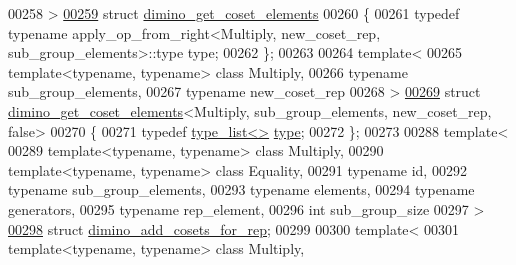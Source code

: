 \begin{DoxyCode}
00258 >
\hyperlink{struct_eigen_1_1internal_1_1group__theory_1_1dimino__get__coset__elements}{00259} \textcolor{keyword}{struct }\hyperlink{struct_eigen_1_1internal_1_1group__theory_1_1dimino__get__coset__elements}{dimino\_get\_coset\_elements}
00260 \{
00261   \textcolor{keyword}{typedef} \textcolor{keyword}{typename} apply\_op\_from\_right<Multiply, new\_coset\_rep, sub\_group\_elements>::type type;
00262 \};
00263 
00264 \textcolor{keyword}{template}<
00265   \textcolor{keyword}{template}<\textcolor{keyword}{typename}, \textcolor{keyword}{typename}> \textcolor{keyword}{class }Multiply,
00266   \textcolor{keyword}{typename} sub\_group\_elements,
00267   \textcolor{keyword}{typename} new\_coset\_rep
00268 >
\hyperlink{struct_eigen_1_1internal_1_1group__theory_1_1dimino__get__coset__elements_3_01_multiply_00_01sub6a817ae4e5806a51bb78ea524863d341}{00269} \textcolor{keyword}{struct }\hyperlink{struct_eigen_1_1internal_1_1group__theory_1_1dimino__get__coset__elements}{dimino\_get\_coset\_elements}<Multiply, sub\_group\_elements, new\_coset\_rep, 
      false>
00270 \{
00271   \textcolor{keyword}{typedef} \hyperlink{struct_eigen_1_1internal_1_1type__list}{type\_list<>} \hyperlink{struct_eigen_1_1internal_1_1type__list}{type};
00272 \};
00273 
00288 \textcolor{keyword}{template}<
00289   \textcolor{keyword}{template}<\textcolor{keyword}{typename}, \textcolor{keyword}{typename}> \textcolor{keyword}{class }Multiply,
00290   \textcolor{keyword}{template}<\textcolor{keyword}{typename}, \textcolor{keyword}{typename}> \textcolor{keyword}{class }Equality,
00291   \textcolor{keyword}{typename} id,
00292   \textcolor{keyword}{typename} sub\_group\_elements,
00293   \textcolor{keyword}{typename} elements,
00294   \textcolor{keyword}{typename} generators,
00295   \textcolor{keyword}{typename} rep\_element,
00296   \textcolor{keywordtype}{int} sub\_group\_size
00297 >
\hyperlink{struct_eigen_1_1internal_1_1group__theory_1_1dimino__add__cosets__for__rep}{00298} \textcolor{keyword}{struct }\hyperlink{struct_eigen_1_1internal_1_1group__theory_1_1dimino__add__cosets__for__rep}{dimino\_add\_cosets\_for\_rep};
00299 
00300 \textcolor{keyword}{template}<
00301   \textcolor{keyword}{template}<\textcolor{keyword}{typename}, \textcolor{keyword}{typename}> \textcolor{keyword}{class }Multiply,

\end{DoxyCode}
